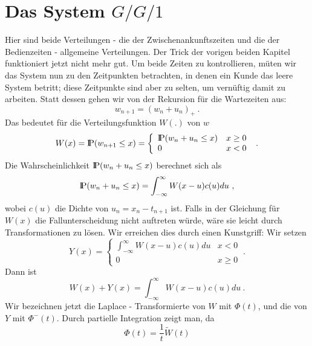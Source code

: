 \section{Das System $G/G/1$}
Hier sind beide Verteilungen - die der Zwischenankunftszeiten und die der
Bedienzeiten - allgemeine Verteilungen. Der Trick der vorigen beiden
Kapitel funktioniert jetzt nicht mehr gut. Um beide Zeiten zu
kontrollieren, mü\3ten wir das System nun zu den Zeitpunkten betrachten,
in denen ein Kunde das leere System betritt; diese Zeitpunkte sind aber zu
selten, um vernüftig damit zu arbeiten. Statt dessen gehen wir von der
Rekursion für die Wartezeiten aus:
\begin{displaymath}
w_{n+1} = (w_{n} + u_{n})_{+} ~.
\end{displaymath}
Das bedeutet für die Verteilungsfunktion $W(.)$ von $w$
\begin{displaymath}
W(x) = {\rm I\kern-0.2em P} (w_{n+1} \leq x) = \left\{
\begin{array}{lc}
{\rm I\kern-0.2em P} (w_{n} + u_{n} \leq x) & x \geq 0 \\
0 & x < 0
\end{array} \right. ~.
\end{displaymath}
Die Wahrscheinlichkeit ${\rm I\kern-0.2em P} (w_{n}+ u_{n} \leq x)$ berechnet sich als
\begin{displaymath}
{\rm I\kern-0.2em P} (w_{n} + u_{n} \leq x) = \int_{- \infty}^{\infty} W(x-u) c(u) du ~,
\end{displaymath}
wobei $c(u)$ die Dichte von $u_{n} = x_{n} - t_{n+1}$ ist. Falls in der
Gleichung für $W(x)$ die Fallunterscheidung nicht auftreten würde, wäre
sie leicht durch Transformationen zu lösen. Wir erreichen dies durch
einen Kunstgriff: Wir setzen
\begin{displaymath}
Y(x) = \left\{
\begin{array}{lc}
\int_{- \infty}^{\infty} W(x-u)c(u) du &  x< 0 \\
0 &  x \geq 0
\end{array} \right. ~.
\end{displaymath}
Dann ist
\begin{displaymath}
W(x) + Y(x) = \int_{-\infty}^{\infty} W(x-u) c(u) du ~.
\end{displaymath}
Wir bezeichnen jetzt die Laplace - Transformierte von $W$ mit $\Phi (t)$,
und die von $Y$ mit $\Phi^{-}(t)$. Durch partielle Integration zeigt man,
da\3
\begin{displaymath}
\Phi (t) = \frac{1}{t} \tilde W(t)
\end{displaymath}
